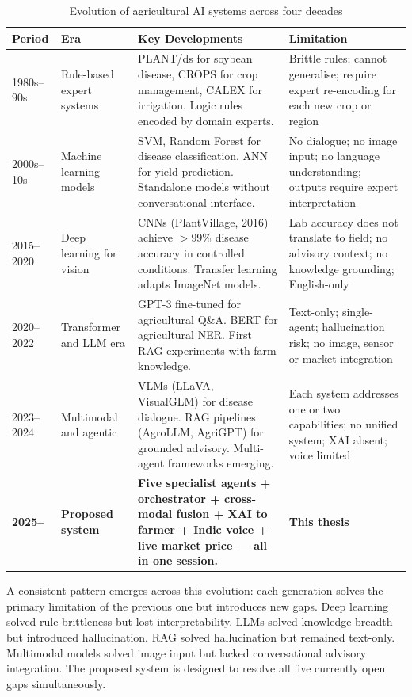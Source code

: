 \documentclass[12pt,a4paper]{article}
\begin{document}
\begingroup\small
\begin{table}[htbp]
\centering
\caption{Evolution of agricultural AI systems across four decades}
\label{tab:evolution_systems}
\begin{tabular}{|p{1.8cm}|p{2.8cm}|p{6.0cm}|p{2.8cm}|}
\hline
\textbf{Period} & \textbf{Era} & \textbf{Key Developments} & \textbf{Limitation} \\ \hline
1980s--90s & Rule-based expert systems & PLANT/ds for soybean disease, CROPS for crop management, CALEX for irrigation. Logic rules encoded by domain experts. & Brittle rules; cannot generalise; require expert re-encoding for each new crop or region \\ \hline
2000s--10s & Machine learning models & SVM, Random Forest for disease classification. ANN for yield prediction. Standalone models without conversational interface. & No dialogue; no image input; no language understanding; outputs require expert interpretation \\ \hline
2015--2020 & Deep learning for vision & CNNs (PlantVillage, 2016) achieve $>$99\% disease accuracy in controlled conditions. Transfer learning adapts ImageNet models. & Lab accuracy does not translate to field; no advisory context; no knowledge grounding; English-only \\ \hline
2020--2022 & Transformer and LLM era & GPT-3 fine-tuned for agricultural Q\&A. BERT for agricultural NER. First RAG experiments with farm knowledge. & Text-only; single-agent; hallucination risk; no image, sensor or market integration \\ \hline
2023--2024 & Multimodal and agentic & VLMs (LLaVA, VisualGLM) for disease dialogue. RAG pipelines (AgroLLM, AgriGPT) for grounded advisory. Multi-agent frameworks emerging. & Each system addresses one or two capabilities; no unified system; XAI absent; voice limited \\ \hline
\textbf{2025--} & \textbf{Proposed system} & \textbf{Five specialist agents + orchestrator + cross-modal fusion + XAI to farmer + Indic voice + live market price --- all in one session.} & \textbf{This thesis} \\ \hline
\end{tabular}
\end{table}
\endgroup

A consistent pattern emerges across this evolution: each generation solves the primary limitation of the previous one but introduces new gaps. Deep learning solved rule brittleness but lost interpretability. LLMs solved knowledge breadth but introduced hallucination. RAG solved hallucination but remained text-only. Multimodal models solved image input but lacked conversational advisory integration. The proposed system is designed to resolve all five currently open gaps simultaneously.
\end{document}
